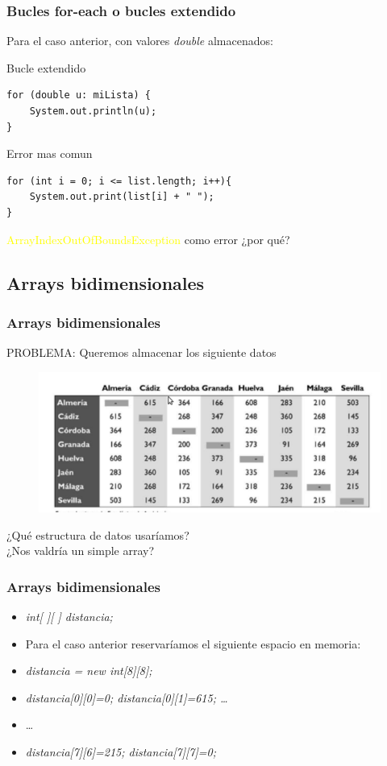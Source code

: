 \documentclass{beamer}
\begin{document}
\begin{frame}[fragile]
\frametitle{Bucles for-each o bucles extendido}
Para el caso anterior, con valores \emph{double} almacenados:
\pause
\begin{block}{Bucle extendido}
\begin{verbatim}
for (double u: miLista) {
    System.out.println(u);
}
\end{verbatim}
\end{block}
\pause
\begin{block}{Error mas comun}
\begin{verbatim}
for (int i = 0; i <= list.length; i++){
    System.out.print(list[i] + " ");
}
\end{verbatim}
\end{block}
\pause 
\textcolor{yellow}{ArrayIndexOutOfBoundsException} como error ¿por qué?
\end{frame}


\subsection{Arrays bidimensionales}
\begin{frame}
\frametitle{Arrays bidimensionales}
PROBLEMA: Queremos almacenar los siguiente datos
\begin{figure}
\includegraphics[scale=0.6]{imagenes/ciudades.png}
\end{figure}
\begin{center}
¿Qué estructura de datos usaríamos?\\
¿Nos valdría un simple array?\\
\end{center}
\end{frame}


\begin{frame}[fragile]
    \frametitle{Arrays bidimensionales}
 \begin{itemize}[<+->]
 \item \emph{int[ ][ ] distancia;}
 \item Para el caso anterior reservaríamos el siguiente espacio en memoria:
 \item \emph{distancia = new int[8][8];}
 \item \emph{distancia[0][0]=0; distancia[0][1]=615; \dots}
 \item \dots
 \item \emph{distancia[7][6]=215; distancia[7][7]=0;}
 \end{itemize}
\end{frame}
\end{document}
